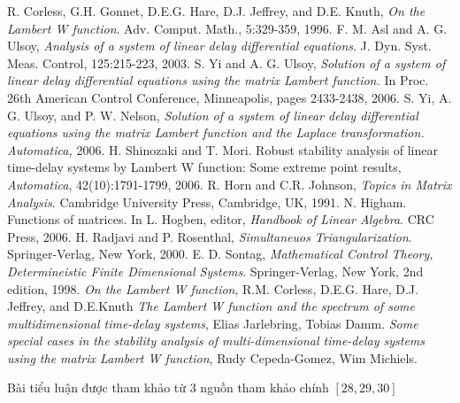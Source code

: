 \begin{thebibliography}{30}
R. Corless, G.H. Gonnet, D.E.G. Hare, D.J. Jeffrey, and D.E. Knuth, \textit{On the Lambert W function}. Adv. Comput. Math., 5:329-359, 1996.
F. M. Asl and A. G. Ulsoy, \textit{Analysis of a system of linear delay differential equations}. J. Dyn. Syst. Meas. Control, 125:215-223, 2003.
S. Yi and A. G. Ulsoy, \textit{Solution of a system of linear delay differential equations using the matrix Lambert function.} In Proc. 26th American Control Conference, Minneapolis, pages 2433-2438, 2006.
S. Yi, A. G. Ulsoy, and P. W. Nelson, \textit{Solution of a system of linear delay differential equations using the matrix Lambert function and the Laplace transformation. Automatica,} 2006.
H. Shinozaki and T. Mori. Robust stability analysis of linear time-delay systems by Lambert W function: Some extreme point results, \textit{Automatica}, 42(10):1791-1799, 2006.
R. Horn and C.R. Johnson, \textit{Topics in Matrix Analysis}. Cambridge University Press, Cambridge, UK, 1991.
N. Higham. Functions of matrices. In L. Hogben, editor, \textit{Handbook of Linear Algebra}. CRC Press, 2006.
H. Radjavi and P. Rosenthal, \textit{Simultaneuos Triangularization}. Springer-Verlag, New York, 2000.
E. D. Sontag, \textit{Mathematical Control Theory, Determineistic Finite Dimensional Systems}. Springer-Verlag, New York, 2nd edition, 1998. 
\textit{On the Lambert W function}, R.M. Corless, D.E.G. Hare, D.J. Jeffrey, and D.E.Knuth 
 \textit{The Lambert W function and the spectrum of some multidimensional time-delay systems}, Elias Jarlebring, Tobias Damm. 
 \textit{Some special cases in the stability analysis of multi-dimensional time-delay systems using the matrix Lambert W function}, Rudy Cepeda-Gomez, Wim Michiels.
\end{thebibliography}
Bài tiểu luận được tham khảo từ 3 nguồn tham khảo chính $[28,29,30]$
 
 
 
 	 


 
 
 
 
 
 
 
 
 
 
 
